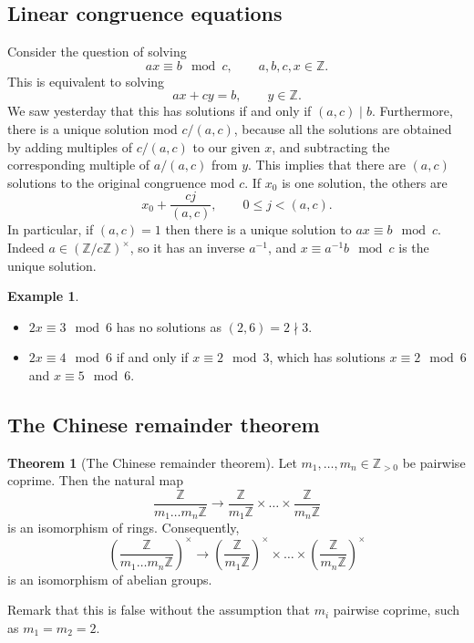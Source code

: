 \documentclass{article}
\newcommand{\Z}{\mathbb{Z}}
\newcommand{\rb}[1]{\left( #1 \right)}
\newcommand{\Unit}[1]{\rb{\dfrac{\Z}{#1\Z}}^\times}
\newcommand{\unit}[1]{\rb{\Z / #1\Z}^\times}
\theoremstyle{definition}\newtheorem{definition}{Definition}
\theoremstyle{definition}\newtheorem{remark}[definition]{Remark}
\theoremstyle{definition}\newtheorem*{example}{Example}
\theoremstyle{definition}\newtheorem*{note}{Note}
\newtheorem{theorem}[definition]{Theorem}
\begin{document}
\subsection{Linear congruence equations}

Consider the question of solving
$$ ax \equiv b \mod c, \qquad a, b, c, x \in \Z. $$
This is equivalent to solving
$$ ax + cy = b, \qquad y \in \Z. $$
We saw yesterday that this has solutions if and only if $ \rb{a, c} \mid b $. Furthermore, there is a unique solution mod $ c / \rb{a, c} $, because all the solutions are obtained by adding multiples of $ c / \rb{a, c} $ to our given $ x $, and subtracting the corresponding multiple of $ a / \rb{a, c} $ from $ y $. This implies that there are $ \rb{a, c} $ solutions to the original congruence mod $ c $. If $ x_0 $ is one solution, the others are
$$ x_0 + \dfrac{cj}{\rb{a, c}}, \qquad 0 \le j < \rb{a, c}. $$
In particular, if $ \rb{a, c} = 1 $ then there is a unique solution to $ ax \equiv b \mod c $. Indeed $ a \in \unit{c} $, so it has an inverse $ a^{-1} $, and $ x \equiv a^{-1}b \mod c $ is the unique solution.

\begin{example}
\hfill
\begin{itemize}
\item $ 2x \equiv 3 \mod 6 $ has no solutions as $ \rb{2, 6} = 2 \nmid 3 $.
\item $ 2x \equiv 4 \mod 6 $ if and only if $ x \equiv 2 \mod 3 $, which has solutions $ x \equiv 2 \mod 6 $ and $ x \equiv 5 \mod 6 $.
\end{itemize}
\end{example}

\subsection{The Chinese remainder theorem}

\begin{theorem}[The Chinese remainder theorem]
\label{thm:14}
Let $ m_1, \dots, m_n \in \Z_{> 0} $ be pairwise coprime. Then the natural map
$$ \dfrac{\Z}{m_1 \dots m_n\Z} \to \dfrac{\Z}{m_1\Z} \times \dots \times \dfrac{\Z}{m_n\Z} $$
is an isomorphism of rings. Consequently,
$$ \Unit{m_1 \dots m_n} \to \Unit{m_1} \times \dots \times \Unit{m_n} $$
is an isomorphism of abelian groups.
\end{theorem}

Remark that this is false without the assumption that $ m_i $ pairwise coprime, such as $ m_1 = m_2 = 2 $.
\end{document}
